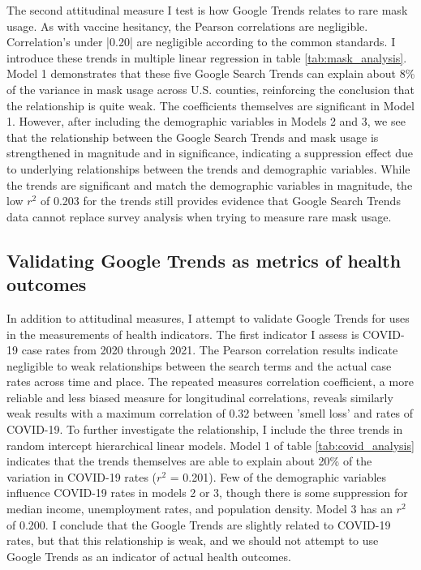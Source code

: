 The second attitudinal measure I test is how Google Trends relates to rare mask
usage. As with vaccine hesitancy, the Pearson correlations are negligible.
Correlation's under |0.20| are negligible according to the
common standards. I introduce these trends in multiple linear regression in
table \ref{tab:mask_analysis}. Model 1 demonstrates that these five Google
Search Trends can explain about 8\% of the variance in mask usage across U.S.
counties, reinforcing the conclusion that the relationship is quite weak. The
coefficients themselves are significant in Model 1. However, after
including the demographic variables in Models 2 and 3, we see that the
relationship between the Google Search Trends and mask usage is strengthened in
magnitude and in significance, indicating a suppression effect due to
underlying relationships between the trends and demographic variables. While the
trends are significant and match the demographic variables in magnitude, the
low $r^2$ of 0.203 for the trends still provides evidence that Google Search
Trends data cannot replace survey analysis when trying to measure rare mask
usage.



\subsection{Validating Google Trends as metrics of health outcomes}

In addition to attitudinal measures, I attempt to validate Google Trends for
uses in the measurements of health indicators. The first indicator I assess is
COVID-19 case rates from 2020 through 2021. The Pearson correlation results
indicate negligible to weak relationships between the search terms and the
actual case rates across time and place. The repeated measures correlation
coefficient, a more reliable and less biased measure for longitudinal
correlations, reveals similarly weak results with a maximum correlation of 0.32
between 'smell loss' and rates of COVID-19. To further investigate the relationship, I
include the three trends in random intercept hierarchical linear models. Model 1
of table \ref{tab:covid_analysis} indicates that the trends themselves are able
to explain about 20\% of the variation in COVID-19 rates ($r^2$ = 0.201). Few
of the demographic variables influence COVID-19 rates in models 2 or 3,
though there is some suppression for median income, unemployment rates,
and population density. Model 3 has an $r^2$ of 0.200. I conclude that the
Google Trends are slightly related to COVID-19 rates, but that this relationship
is weak, and we should not attempt to use Google Trends as an indicator of actual
health outcomes.

